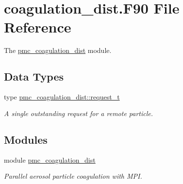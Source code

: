 \hypertarget{coagulation__dist_8_f90}{}\section{coagulation\+\_\+dist.\+F90 File Reference}
\label{coagulation__dist_8_f90}


The \mbox{\hyperlink{namespacepmc__coagulation__dist}{pmc\+\_\+coagulation\+\_\+dist}} module.  


\subsection*{Data Types}
\begin{DoxyCompactItemize}
\item 
type \mbox{\hyperlink{structpmc__coagulation__dist_1_1request__t}{pmc\+\_\+coagulation\+\_\+dist\+::request\+\_\+t}}
\begin{DoxyCompactList}\small\item\em A single outstanding request for a remote particle. \end{DoxyCompactList}\end{DoxyCompactItemize}
\subsection*{Modules}
\begin{DoxyCompactItemize}
\item 
module \mbox{\hyperlink{namespacepmc__coagulation__dist}{pmc\+\_\+coagulation\+\_\+dist}}
\begin{DoxyCompactList}\small\item\em Parallel aerosol particle coagulation with M\+PI. \end{DoxyCompactList}\end{DoxyCompactItemize}
